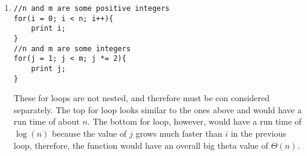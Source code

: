 \documentclass[12pt]{article}
\begin{document}
\begin{enumerate}
\newpage
    	\item 
\begin{lstlisting}
//n and m are some positive integers
for(i = 0; i < n; i++){
    print i;
}
//n and m are some integers
for(j = 1; j < m; j *= 2){
    print j;
}
\end{lstlisting}
These for loops are not nested, and therefore must be con considered separately. The top for loop looks similar to the ones above and would have a run time of about $n$. The bottom for loop, however, would have a run time of $\log(n)$ because the value of $j$ grows much faster than $i$ in the previous loop, therefore, the function would have an overall big theta value of $\boxed{\Theta(n)}$.
    \end{enumerate}
\end{document}
